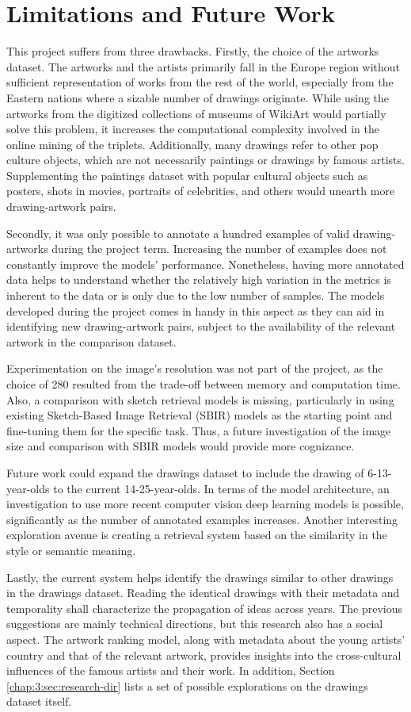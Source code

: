 \section{Limitations and Future Work}

This project suffers from three drawbacks. Firstly, the choice of the artworks dataset. The artworks and the artists primarily fall in the Europe region without sufficient representation of works from the rest of the world, especially from the Eastern nations where a sizable number of drawings originate. While using the artworks from the digitized collections of museums of WikiArt would partially solve this problem, it increases the computational complexity involved in the online mining of the triplets. Additionally, many drawings refer to other pop culture objects, which are not necessarily paintings or drawings by famous artists. Supplementing the paintings dataset with popular cultural objects such as posters, shots in movies, portraits of celebrities, and others would unearth more drawing-artwork pairs.

Secondly, it was only possible to annotate a hundred examples of valid drawing-artworks during the project term. Increasing the number of examples does not constantly improve the models' performance. Nonetheless, having more annotated data helps to understand whether the relatively high variation in the metrics is inherent to the data or is only due to the low number of samples. The models developed during the project comes in handy in this aspect as they can aid in identifying new drawing-artwork pairs, subject to the availability of the relevant artwork in the comparison dataset.

Experimentation on the image's resolution was not part of the project, as the choice of 280 resulted from the trade-off between memory and computation time. Also, a comparison with sketch retrieval models is missing, particularly in using existing Sketch-Based Image Retrieval (SBIR) models as the starting point and fine-tuning them for the specific task. Thus, a future investigation of the image size and comparison with SBIR models would provide more cognizance.

Future work could expand the drawings dataset to include the drawing of 6-13-year-olds to the current 14-25-year-olds. In terms of the model architecture, an investigation to use more recent computer vision deep learning models is possible, significantly as the number of annotated examples increases. Another interesting exploration avenue is creating a retrieval system based on the similarity in the style or semantic meaning. 

Lastly, the current system helps identify the drawings similar to other drawings in the drawings dataset. Reading the identical drawings with their metadata and temporality shall characterize the propagation of ideas across years. The previous suggestions are mainly technical directions, but this research also has a social aspect. The artwork ranking model, along with metadata about the young artists' country and that of the relevant artwork, provides insights into the cross-cultural influences of the famous artists and their work. In addition, Section \ref{chap:3:sec:research-dir} lists a set of possible explorations on the drawings dataset itself.